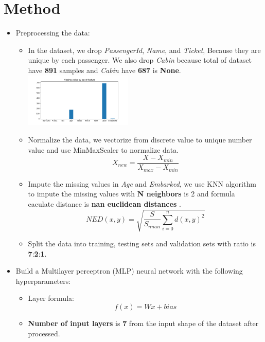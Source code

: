 \documentclass{article}
\begin{document}
\section{Method}

\begin{itemize}
    \item Preprocessing the data:
        \begin{itemize}
            \item In the dataset, we drop \textit{PassengerId}, \textit{Name}, and \textit{Ticket},
            Because they are unique by each passenger.
            We also drop \textit{Cabin} because total of dataset have \textbf{891} samples and \textit{Cabin} have \textbf{687} is \textbf{None}.
            \includegraphics[width=0.425\textwidth]{missing.png}   
            \item Normalize the data, we vectorize from discrete value to unique number value and use MinMaxScaler to normalize data.
            \[
               X_{new} = \frac{X - X_{min}}{X_{max} - X_{min}}
            \]
            \item Impute the missing values in \textit{Age} and \textit{Embarked},
            we use KNN algorithm to impute the missing values with \textbf{N neighbors} is 2 and formula caculate distance is \textbf{nan euclidean distances} .
            \[
            NED(x,y) = \sqrt{\frac{S}{S_{nnan}} \sum^n_{i=0} d(x,y)^2 }  
            \]
            \item Split the data into training, testing sets and validation sets with ratio is \textbf{7}:\textbf{2}:\textbf{1}.
        \end{itemize}
    \item Build a Multilayer perceptron (MLP) neural network with the following hyperparameters:
        \begin{itemize}
            \item Layer formula:
            \[
            f(x) = Wx + \textit{bias} 
            \]
            \item \textbf{Number of input layers} is \textbf{7} from the input shape of the dataset after processed.

\end{itemize}
\end{itemize}
\end{document}
